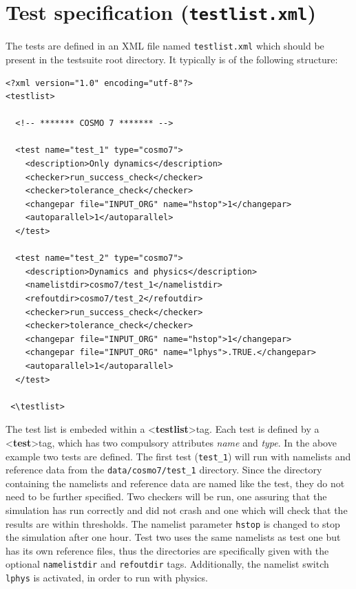 \documentclass[12pt,twoside,a4paper]{report}
\newcommand{\tl}{\textless}
\newcommand{\tg}{\textgreater}
\newcommand{\tbf}{\textbf}
\newcommand{\tit}{\textit}
\newcommand{\hs}{\hspace{1mm}}
\begin{document}
\newpage
\section{Test specification (\texttt{testlist.xml})}
\label{sec:testlist}
The tests are defined in an XML file named \texttt{testlist.xml} which should be present in the testsuite root directory. It typically is of the following structure:

\begin{verbatim}
<?xml version="1.0" encoding="utf-8"?>
<testlist>

  <!-- ******* COSMO 7 ******* -->

  <test name="test_1" type="cosmo7">
    <description>Only dynamics</description>
    <checker>run_success_check</checker>
    <checker>tolerance_check</checker>
    <changepar file="INPUT_ORG" name="hstop">1</changepar>
    <autoparallel>1</autoparallel>
  </test>
  
  <test name="test_2" type="cosmo7">
    <description>Dynamics and physics</description>
    <namelistdir>cosmo7/test_1</namelistdir>
    <refoutdir>cosmo7/test_2</refoutdir>
    <checker>run_success_check</checker>
    <checker>tolerance_check</checker>
    <changepar file="INPUT_ORG" name="hstop">1</changepar>
    <changepar file="INPUT_ORG" name="lphys">.TRUE.</changepar>
    <autoparallel>1</autoparallel>
  </test>
  
 <\testlist>
\end{verbatim}

The test list is embeded within a \tl \tbf{testlist}\tg \hs tag. Each test is defined by a \tl \tbf{test}\tg  \hs tag, which has two compulsory attributes \tit{name} and \tit{type}. In the above example two tests are defined. The first test (\texttt{test\_1}) will run with namelists and reference data from the \texttt{data/cosmo7/test\_1} directory. Since the directory containing the namelists and reference data are named like the test, they do not need to be further specified. Two checkers will be run, one assuring that the simulation has run correctly and did not crash and one which will check that the results are within thresholds. The namelist parameter \texttt{hstop} is changed to stop the simulation after one hour. Test two uses the same namelists as test one but has its own reference files, thus the directories are specifically given with the optional \texttt{namelistdir} and \texttt{refoutdir} tags. Additionally, the namelist switch \texttt{lphys} is activated, in order to run with physics.
\end{document}
